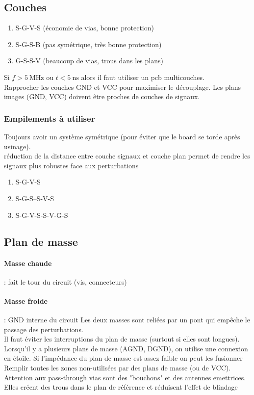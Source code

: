 \documentclass[resume]{subfiles}
\begin{document}
\begin{multicols}{3}
\subsection{Couches}
\begin{enumerate}
\item S-G-V-S (économie de vias, bonne protection)
\item S-G-S-B (pas symétrique, très bonne protection)
\item G-S-S-V (beaucoup de vias, trous dans les plans)
\end{enumerate}
Si $f>\SI{5}{\mega\hertz}$ ou $t<\SI{5}{\nano\second}$ alors il faut utiliser un pcb multicouches.\\
Rapprocher les couches GND et VCC pour maximiser le découplage. Les plans images (GND, VCC) doivent être proches de couches de signaux.
\subsubsection{Empilements à utiliser}
Toujours avoir un système symétrique (pour éviter que le board se torde après usinage).\\
réduction de la distance entre couche signaux et couche plan permet de rendre les signaux plus robustes face aux perturbations
\begin{enumerate}
\item S-G-V-S
\item S-G-S--S-V-S
\item S-G-V-S-S-V-G-S
\end{enumerate}
\subsection{Plan de masse}
\paragraph{Masse chaude} : fait le tour du circuit (vis, connecteurs)
\paragraph{Masse froide} : GND interne du circuit
Les deux masses sont reliées par un pont qui empêche le passage des perturbations.\\
Il faut éviter les interruptions du plan de masse (surtout si elles sont longues).\\
Lorsqu'il y a plusieurs plans de masse (AGND, DGND), on utilise une connexion en étoile. Si l'impédance du plan de masse est assez faible on peut les fusionner\\
Remplir toutes les zones non-utilisées par des plans de masse (ou de VCC).\\
Attention aux pass-through vias sont des "bouchons" et des antennes emettrices. Elles créent des trous dans le plan de référence et réduisent l'effet de blindage

\end{multicols}
\end{document}
